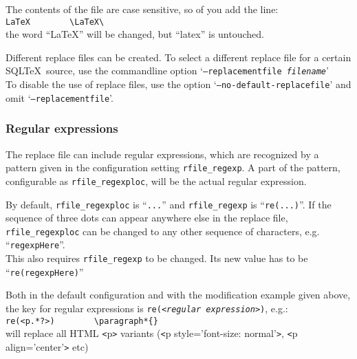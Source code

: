 \documentclass{article}
\newcommand{\vs}{\vspace{3mm}}
\begin{document}
The contents of the file are case sensitive, so of you add the line: \\
\verb+LaTeX        \LaTeX\+ \\
the word ``LaTeX'' will be changed, but ``latex'' is untouched.

\vspace{3mm}

Different replace files can be created. To select a different replace file for a certain SQL\TeX\ source, use the commandline option `\texttt{--replacementfile \textit{filename}}'\\
To disable the use of replace files, use the option `\texttt{--no-default-replacefile}' and omit `\texttt{--replacementfile}'.

\subsubsection{Regular expressions}\label{regexp}

The replace file can include regular expressions, which are recognized by a pattern given in the configuration setting \texttt{rfile\_regexp}. A part of the pattern, configurable as \texttt{rfile\_regexploc}, will be the actual regular expression.

\vs

By default, \texttt{rfile\_regexploc} is ``\texttt{...}'' and \texttt{rfile\_regexp} is ``\texttt{re(...)}''. If the sequence of three dots can appear anywhere else in the replace file, \texttt{rfile\_regexploc} can be changed to any other sequence of characters, e.g. ``\texttt{regexpHere}''.\\
This also requires \texttt{rfile\_regexp} to be changed. Its new value has to be ``\texttt{re(regexpHere)}''
 
\vs

Both in the default configuration and with the modification example given above, the key for regular expressions is \texttt{re(<\textit{regular expression}>)}, e.g.:\\
\hspace{3mm}\verb+re(<p.*?>)		\paragraph*{}+ \\
will replace all HTML \texttt{<}p\texttt{>} variants (\texttt{<}p style='font-size: normal'\texttt{>}, \texttt{<}p align='center'\texttt{>} etc)

\vs
\end{document}
